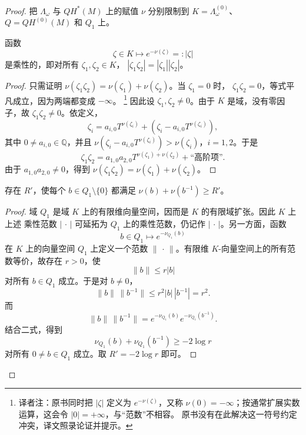 \begin{proof}
把 $\Lambda_\omega$ 与 $QH^*(M)$ 上的赋值 $\nu$ 分别限制到
$K=\Lambda_\omega^{(0)}$、$Q=QH^{(0)}(M)$ 和 $Q_1$ 上。

\begin{lemma}
\label{lem:22-multiplicative-valuation-norm}
函数
\[
 \zeta\in K\longmapsto e^{-\nu(\zeta)}=:|\zeta|
\]
是乘性的，即对所有 $\zeta_1,\zeta_2\in K$，
$|\zeta_1\zeta_2|=|\zeta_1||\zeta_2|$。
\end{lemma}

\begin{proof}
只需证明
$\nu(\zeta_1\zeta_2)=\nu(\zeta_1)+\nu(\zeta_2)$。当 $\zeta_1=0$ 时，
$\zeta_1\zeta_2=0$，等式平凡成立，因为两端都变成 $-\infty$。
\footnote{译者注：原书同时把 $|\zeta|$ 定义为 $e^{-\nu(\zeta)}$，又称
$\nu(0)=-\infty$；按通常扩展实数运算，这会令 $|0|=+\infty$，与“范数”不相容。
原书没有在此解决这一符号约定冲突，译文照录论证并提示。}
因此设 $\zeta_1,\zeta_2\neq0$。由于 $K$ 是域，没有零因子，故
$\zeta_1\zeta_2\neq0$。依定义，
\[
 \zeta_i=a_{i,0}T^{\nu(\zeta_i)}
 +(\zeta_i-a_{i,0}T^{\nu(\zeta_i)}),
\]
其中 $0\neq a_{i,0}\in\mathbb Q$，并且
$\nu(\zeta_i-a_{i,0}T^{\nu(\zeta_i)})>\nu(\zeta_i)$，$i=1,2$。于是
\[
 \zeta_1\zeta_2=a_{1,0}a_{2,0}T^{\nu(\zeta_1)+\nu(\zeta_2)}
 +\text{“高阶项”}.
\]
由于 $a_{1,0}a_{2,0}\neq0$，得到
$\nu(\zeta_1\zeta_2)=\nu(\zeta_1)+\nu(\zeta_2)$。
\end{proof}

\begin{proposition}
\label{prop:22-field-valuation-bound}
存在 $R'$，使每个 $b\in Q_1\setminus\{0\}$ 都满足
$\nu(b)+\nu(b^{-1})\geq R'$。
\end{proposition}

\begin{proof}
域 $Q_1$ 是域 $K$ 上的有限维向量空间，因而是 $K$ 的有限域扩张。因此 $K$ 上上述
乘性范数 $|\,\cdot\,|$ 可延拓为 $Q_1$ 上的乘性范数，仍记作
$|\,\cdot\,|$。另一方面，函数
\[
 b\in Q_1\longmapsto e^{-\nu_{Q_1}(b)}
\]
在 $K$ 上的向量空间 $Q_1$ 上定义一个范数 $\lVert\,\cdot\,\rVert$。有限维
$K$-向量空间上的所有范数等价，故存在 $r>0$，使
\[
 \lVert b\rVert\leq r|b|
\]
对所有 $b\in Q_1$ 成立。于是对 $b\neq0$，
\[
 \lVert b\rVert\,\lVert b^{-1}\rVert
 \leq r^2|b|\,|b^{-1}|=r^2.
\]
而
\[
 \lVert b\rVert\,\lVert b^{-1}\rVert
 =e^{-\nu_{Q_1}(b)}e^{-\nu_{Q_1}(b^{-1})}.
\]
结合二式，得到
\begin{equation}
 \nu_{Q_1}(b)+\nu_{Q_1}(b^{-1})\geq-2\log r
 \label{eq:22-field-valuation-estimate}
\end{equation}
对所有 $0\neq b\in Q_1$ 成立。取 $R'=-2\log r$ 即可。
\end{proof}


\end{proof}
